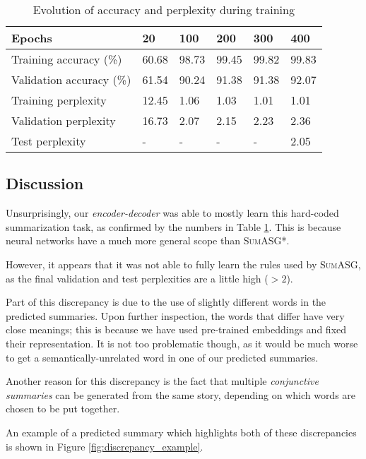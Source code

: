 \begin{table}[H]
\centering
\begin{tabular}{@{}llllll@{}}
\toprule
Epochs                & 20 & 100 & 200 & 300 & 400 \\ \midrule
Training accuracy (\%)     & 60.68   & 98.73   & 99.45    & 99.82    & 99.83    \\
Validation accuracy (\%)   & 61.54   & 90.24   & 91.38    & 91.38    & 92.07    \\
Training perplexity   & 12.45   & 1.06   & 1.03    & 1.01    & 1.01    \\
Validation perplexity & 16.73   & 2.07   & 2.15    & 2.23    & 2.36    \\
Test perplexity & -   & -   & -    & -    & 2.05    \\ \bottomrule
\end{tabular}
\caption{Evolution of accuracy and perplexity during training}
\label{table:training_metrics}
\end{table}

\subsection*{Discussion}

Unsurprisingly, our \textit{encoder-decoder} was able to mostly learn this hard-coded summarization task, as confirmed by the numbers in Table \ref{table:training_metrics}. This is because neural networks have a much more general scope than \textsc{SumASG*}.

However, it appears that it was not able to fully learn the rules used by \textsc{SumASG}, as the final validation and test perplexities are a little high ($> 2$).

Part of this discrepancy is due to the use of slightly different words in the predicted summaries. Upon further inspection, the words that differ have very close meanings; this is because we have used pre-trained embeddings and fixed their representation. It is not too problematic though, as it would be much worse to get a semantically-unrelated word in one of our predicted summaries.

Another reason for this discrepancy is the fact that multiple \textit{conjunctive summaries} can be generated from the same story, depending on which words are chosen to be put together.

An example of a predicted summary which highlights both of these discrepancies is shown in Figure \ref{fig:discrepancy_example}.

